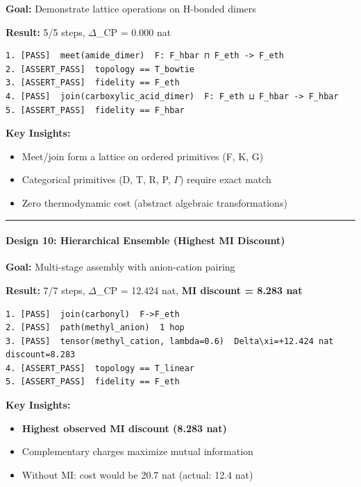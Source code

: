 \documentclass[12pt,a4paper]{article}
\begin{document}
\textbf{Goal:} Demonstrate lattice operations on H-bonded dimers

\textbf{Result:} 5/5 steps, $\Delta$\xi\_CP = 0.000 nat

\begin{lstlisting}
1. [PASS]  meet(amide_dimer)  F: F_hbar ⊓ F_eth -> F_eth
2. [ASSERT_PASS]  topology == T_bowtie
3. [ASSERT_PASS]  fidelity == F_eth
4. [PASS]  join(carboxylic_acid_dimer)  F: F_eth ⊔ F_hbar -> F_hbar
5. [ASSERT_PASS]  fidelity == F_hbar
\end{lstlisting}

\textbf{Key Insights:}

\begin{itemize}
    \item Meet/join form a lattice on ordered primitives (F, K, G)
    \item Categorical primitives (D, T, R, P, $\Gamma$) require exact match
    \item Zero thermodynamic cost (abstract algebraic transformations)
\end{itemize}

\begin{center}
\rule{0.5\textwidth}{0.4pt}
\end{center}

\paragraph{Design 10: Hierarchical Ensemble (Highest MI Discount) }

\textbf{Goal:} Multi-stage assembly with anion-cation pairing

\textbf{Result:} 7/7 steps, $\Delta$\xi\_CP = 12.424 nat, \textbf{MI discount = 8.283 nat}

\begin{lstlisting}
1. [PASS]  join(carbonyl)  F->F_eth
2. [PASS]  path(methyl_anion)  1 hop
3. [PASS]  tensor(methyl_cation, lambda=0.6)  Delta\xi=+12.424 nat  discount=8.283
4. [ASSERT_PASS]  topology == T_linear
5. [ASSERT_PASS]  fidelity == F_eth
\end{lstlisting}

\textbf{Key Insights:}

\begin{itemize}
    \item \textbf{Highest observed MI discount (8.283 nat)}
    \item Complementary charges maximize mutual information
    \item Without MI: cost would be 20.7 nat (actual: 12.4 nat)
\end{itemize}
\end{document}

